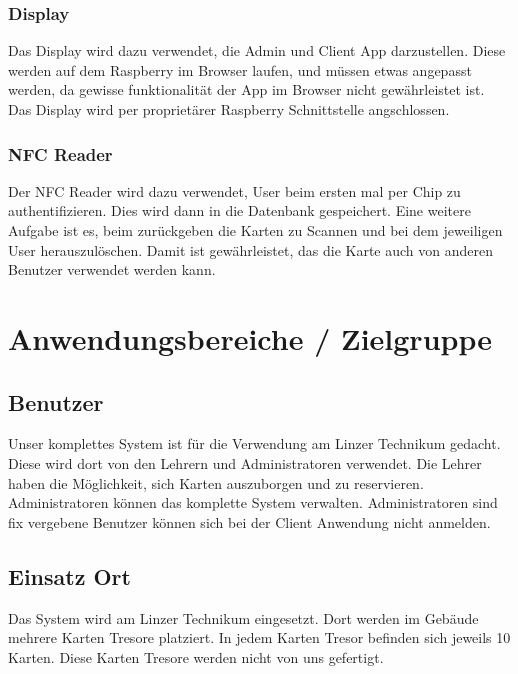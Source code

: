 \subsubsection{Display}
Das Display wird dazu verwendet, die Admin und Client App darzustellen. Diese werden auf dem Raspberry im Browser laufen, und müssen etwas angepasst werden, da gewisse funktionalität der App im Browser nicht gewährleistet ist. Das Display wird per proprietärer Raspberry Schnittstelle angschlossen.

\subsubsection{NFC Reader}
Der NFC Reader wird dazu verwendet, User beim ersten mal per Chip zu authentifizieren. Dies wird dann in die Datenbank gespeichert. Eine weitere Aufgabe ist es, beim zurückgeben die Karten zu Scannen und bei dem jeweiligen User herauszulöschen. Damit ist gewährleistet, das die Karte auch von anderen Benutzer verwendet werden kann.

\section{Anwendungsbereiche / Zielgruppe}
\subsection{Benutzer}
Unser komplettes System ist für die Verwendung am Linzer Technikum gedacht. Diese wird dort von den Lehrern und Administratoren verwendet. Die Lehrer haben die Möglichkeit, sich Karten auszuborgen und zu reservieren. Administratoren können das komplette System verwalten. Administratoren sind fix vergebene Benutzer können sich bei der Client Anwendung nicht anmelden.

\subsection{Einsatz Ort}
Das System wird am Linzer Technikum eingesetzt. Dort werden im Gebäude mehrere Karten Tresore platziert. In jedem Karten Tresor befinden sich jeweils 10 Karten. Diese Karten Tresore werden nicht von uns gefertigt.